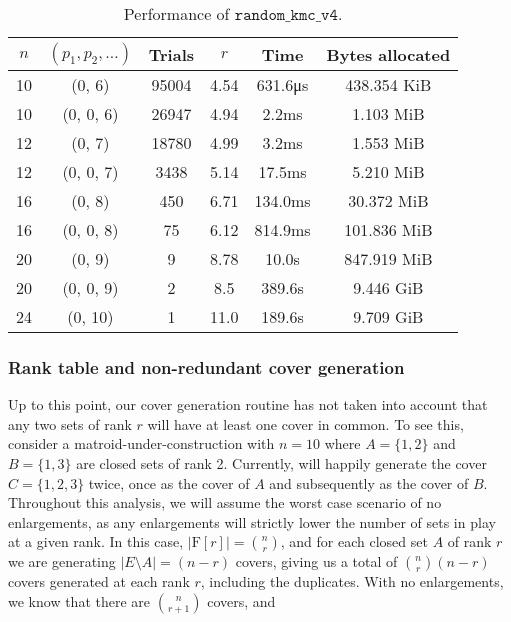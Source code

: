 \begin{table}
  \centering
  \begin{tabular}{cccccc}
    \toprule
      $n$ & $(p_1, p_2, \ldots)$ & Trials & $r$   & Time    & Bytes allocated \\
    \midrule
      10  & (0, 6)    & 95004  & 4.54  & 631.6\unit{\us} & 438.354 KiB     \\
      10  & (0, 0, 6) & 26947  & 4.94  & 2.2ms           & 1.103 MiB     \\
      12  & (0, 7)    & 18780  & 4.99  & 3.2ms           & 1.553 MiB     \\
      12  & (0, 0, 7) & 3438   & 5.14  & 17.5ms          & 5.210 MiB     \\
      16  & (0, 8)    & 450    & 6.71  & 134.0ms         & 30.372 MiB     \\
      16  & (0, 0, 8) & 75     & 6.12  & 814.9ms         & 101.836 MiB     \\
      20  & (0, 9)    & 9      & 8.78  & 10.0s           & 847.919 MiB     \\
      20  & (0, 0, 9) & 2      & 8.5   & 389.6s          & 9.446 GiB     \\
      24  & (0, 10)   & 1      & 11.0  & 189.6s          & 9.709 GiB     \\
    \bottomrule
    \end{tabular}
  \caption{Performance of $\texttt{random\_kmc\_v4}$.}
  \label{tab:perf_v4}
\end{table}

\subsubsection{Rank table and non-redundant cover generation}
Up to this point, our cover generation routine has not taken into account that any two sets of rank $r$ will have at least one cover in common. To see this, consider a matroid-under-construction with $n=10$ where $A = \{1,2\}$ and $B = \{1,3\}$ are closed sets of rank 2. Currently,  will happily generate the cover $C=\{1,2,3\}$ twice, once as the cover of $A$ and subsequently as the cover of $B$. Throughout this analysis, we will assume the worst case scenario of no enlargements, as any enlargements will strictly lower the number of sets in play at a given rank. In this case, $|\mathrm{F}[r]| = \binom{n}{r}$, and for each closed set $A$ of rank $r$ we are generating $|E\setminus A| = (n-r)$ covers, giving us a total of $\binom{n}{r}(n-r)$ covers generated at each rank $r$, including the duplicates. With no enlargements, we know that there are $\binom{n}{r+1}$ covers, and

